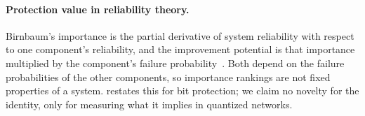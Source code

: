 \paragraph{Protection value in reliability theory.} Birnbaum's importance is the partial derivative of system reliability with respect to one component's reliability, and the improvement potential is that importance multiplied by the component's failure probability~\cite{birnbaum1969importance,rausand2004system}. Both depend on the failure probabilities of the other components, so importance rankings are not fixed properties of a system.  restates this for bit protection; we claim no novelty for the identity, only for measuring what it implies in quantized networks.
